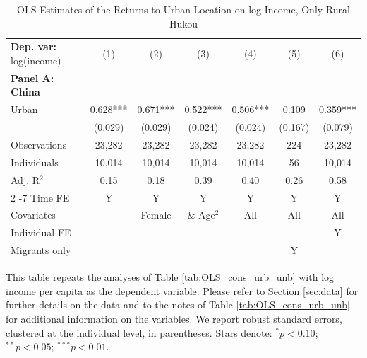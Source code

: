 \begin{table}[htbp] \centering \begin{threeparttable}
 \caption{OLS Estimates of the Returns to Urban Location on log Income, Only Rural Hukou} 
 \label{tab:OLS_CHN_hukou_rural_only_income_urban_unb} 
\begin{tabular}{l cccccc} \toprule  \textbf{Dep. var:}  log(income) 
                    &\multicolumn{1}{c}{(1)}   &\multicolumn{1}{c}{(2)}   &\multicolumn{1}{c}{(3)}   &\multicolumn{1}{c}{(4)}   &\multicolumn{1}{c}{(5)}   &\multicolumn{1}{c}{(6)}   \\
\textbf{Panel A: China} \\
Urban               &       0.628***&       0.671***&       0.522***&       0.506***&       0.109   &       0.359***\\
                    &     (0.029)   &     (0.029)   &     (0.024)   &     (0.024)   &     (0.167)   &     (0.079)   \\
\addlinespace
Observations        &      23,282   &      23,282   &      23,282   &      23,282   &         224   &      23,282   \\
Individuals         &      10,014   &      10,014   &      10,014   &      10,014   &          56   &      10,014   \\
Adj. R$^{2}$        &        0.15   &        0.18   &        0.39   &        0.40   &        0.26   &        0.58   \\
\cmidrule{2 -7} Time FE & Y & Y & Y & Y & Y & Y \\ Covariates & & Female & \& Age$^2$ & All & All & All \\ Individual FE & & & & & & Y \\ Migrants only & & & & & Y & \\ \bottomrule \end{tabular} \begin{tablenotes}[flushleft] \footnotesize \item{This table repeats the analyses of Table \ref{tab:OLS_cons_urb_unb} with log income per capita as the dependent variable. Please refer to Section \ref{sec:data} for further details on the data and to the notes of Table \ref{tab:OLS_cons_urb_unb} for additional information on the variables. We report robust standard errors, clustered at the individual level, in parentheses. Stars denote: $^{*} p<0.10$; $^{**} p<0.05$; $^{***} p<0.01$.} \end{tablenotes} \end{threeparttable} \end{table}
